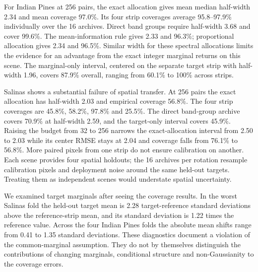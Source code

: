 For Indian Pines at 256 pairs, the exact allocation gives mean median half-width 2.34 and mean coverage 97.0\%. Its four strip coverages average 95.8--97.9\% individually over the 16 archives. Direct band groups require half-width 3.68 and cover 99.6\%. The mean-information rule gives 2.33 and 96.3\%; proportional allocation gives 2.34 and 96.5\%. Similar width for these spectral allocations limits the evidence for an advantage from the exact integer marginal returns on this scene. The marginal-only interval, centered on the separate target strip with half-width 1.96, covers 87.9\% overall, ranging from 60.1\% to 100\% across strips.

Salinas shows a substantial failure of spatial transfer. At 256 pairs the exact allocation has half-width 2.03 and empirical coverage 56.8\%. The four strip coverages are 45.8\%, 58.2\%, 97.8\% and 25.5\%. The direct band-group archive covers 70.9\% at half-width 2.59, and the target-only interval covers 45.9\%. Raising the budget from 32 to 256 narrows the exact-allocation interval from 2.50 to 2.03 while its center RMSE stays at 2.04 and coverage falls from 76.1\% to 56.8\%. More paired pixels from one strip do not ensure calibration on another. Each scene provides four spatial holdouts; the 16 archives per rotation resample calibration pixels and deployment noise around the same held-out targets. Treating them as independent scenes would understate spatial uncertainty.

We examined target marginals after seeing the coverage results. In the worst Salinas fold the held-out target mean is 2.28 target-reference standard deviations above the reference-strip mean, and its standard deviation is 1.22 times the reference value. Across the four Indian Pines folds the absolute mean shifts range from 0.41 to 1.35 standard deviations. These diagnostics document a violation of the common-marginal assumption. They do not by themselves distinguish the contributions of changing marginals, conditional structure and non-Gaussianity to the coverage errors.
